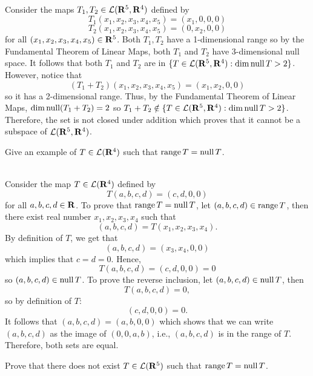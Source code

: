 \begin{solution}
    \\ Consider the maps $T_1, T_2 \in \mathcal{L}(\mathbf{R}^5, \mathbf{R}^4)$ defined by
    $$T_1(x_1, x_2, x_3, x_4, x_5) = (x_1, 0, 0, 0)$$
    $$T_2(x_1, x_2, x_3, x_4, x_5) = (0, x_2, 0, 0)$$
    for all $(x_1, x_2, x_3, x_4, x_5) \in \mathbf{R}^5$. Both $T_1, T_2$ have a 1-dimensional range so by the Fundamental Theorem of Linear Maps, both $T_1$ and $T_2$ have 3-dimensional null space. It follows that both $T_1$ and $T_2$ are in $\{T \in \mathcal{L}(\mathbf{R}^5, \mathbf{R}^4) : \dim \operatorname{\text{null}} T > 2\}$. However, notice that
    $$(T_1 + T_2)(x_1, x_2, x_3, x_4, x_5) = (x_1, x_2, 0, 0)$$
    so it has a 2-dimensional range. Thus, by the Fundamental Theorem of Linear Maps, $\dim \operatorname{\text{null}} (T_1 + T_2) = 2$ so $T_1 + T_2 \notin \{T \in \mathcal{L}(\mathbf{R}^5, \mathbf{R}^4) : \dim \operatorname{\text{null}} T > 2\}$. Therefore, the set is not closed under addition which proves that it cannot be a subspace of $\mathcal{L}(\mathbf{R}^5, \mathbf{R}^4)$. \\
\end{solution}

\begin{exercise}
    Give an example of $T \in \mathcal{L}(\mathbf{R}^4)$ such that $\operatorname{\text{range}} T = \operatorname{\text{null}} T$. \\
\end{exercise}

\begin{solution}
    \\ Consider the map $T \in \mathcal{L}(\mathbf{R}^4)$ defined by
    $$T(a,b,c,d) = (c, d, 0, 0)$$
    for all $a,b,c,d \in \mathbf{R}$. To prove that $\operatorname{\text{range}} T = \operatorname{\text{null}} T$, let $(a,b,c,d) \in \operatorname{\text{range}} T$, then there exist real number $x_1, x_2, x_3, x_4$ such that
    $$(a,b,c,d) = T(x_1, x_2, x_3, x_4).$$
    By definition of $T$, we get that
    $$(a,b,c,d) = (x_3, x_4, 0, 0)$$
    which implies that $c = d = 0$. Hence, 
    $$T(a,b,c,d) = (c,d,0,0) = 0$$
    so $(a,b,c,d) \in \operatorname{\text{null}} T$. To prove the reverse inclusion, let $(a,b,c,d) \in \operatorname{\text{null}} T$, then
    $$T(a,b,c,d) = 0,$$
    so by definition of $T$:
    $$(c,d,0,0) = 0.$$
    It follows that $(a,b,c,d) = (a,b,0,0)$ which shows that we can write $(a,b,c,d)$ as the image of $(0,0,a,b)$, i.e., $(a,b,c,d)$ is in the range of $T$. Therefore, both sets are equal. \\
\end{solution}

\begin{exercise}
    Prove that there does not exist $T \in \mathcal{L}(\mathbf{R}^5)$ such that $\operatorname{\text{range}} T = \operatorname{\text{null}} T$. \\
\end{exercise}

